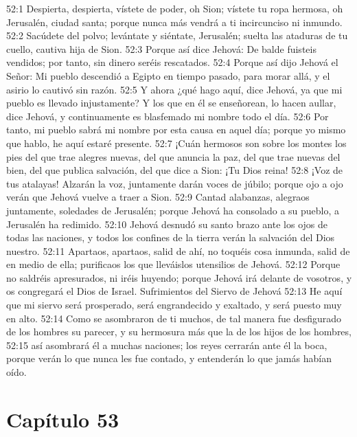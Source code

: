 52:1 Despierta, despierta, vístete de poder, oh Sion; vístete tu ropa hermosa, oh Jerusalén, ciudad santa; porque nunca más vendrá a ti incircunciso ni inmundo. 
52:2 Sacúdete del polvo; levántate y siéntate, Jerusalén; suelta las ataduras de tu cuello, cautiva hija de Sion. 
52:3 Porque así dice Jehová: De balde fuisteis vendidos; por tanto, sin dinero seréis rescatados. 
52:4 Porque así dijo Jehová el Señor: Mi pueblo descendió a Egipto en tiempo pasado, para morar allá, y el asirio lo cautivó sin razón. 
52:5 Y ahora ¿qué hago aquí, dice Jehová, ya que mi pueblo es llevado injustamente? Y los que en él se enseñorean, lo hacen aullar, dice Jehová, y continuamente es blasfemado mi nombre todo el día. 
52:6 Por tanto, mi pueblo sabrá mi nombre por esta causa en aquel día; porque yo mismo que hablo, he aquí estaré presente. 
52:7 ¡Cuán hermosos son sobre los montes los pies del que trae alegres nuevas, del que anuncia la paz, del que trae nuevas del bien, del que publica salvación, del que dice a Sion: ¡Tu Dios reina! 
52:8 ¡Voz de tus atalayas! Alzarán la voz, juntamente darán voces de júbilo; porque ojo a ojo verán que Jehová vuelve a traer a Sion. 
52:9 Cantad alabanzas, alegraos juntamente, soledades de Jerusalén; porque Jehová ha consolado a su pueblo, a Jerusalén ha redimido. 
52:10 Jehová desnudó su santo brazo ante los ojos de todas las naciones, y todos los confines de la tierra verán la salvación del Dios nuestro. 
52:11 Apartaos, apartaos, salid de ahí, no toquéis cosa inmunda, salid de en medio de ella; purificaos los que lleváislos utensilios de Jehová. 
52:12 Porque no saldréis apresurados, ni iréis huyendo; porque Jehová irá delante de vosotros, y os congregará el Dios de Israel. 
Sufrimientos del Siervo de Jehová 
52:13 He aquí que mi siervo será prosperado, será engrandecido y exaltado, y será puesto muy en alto. 
52:14 Como se asombraron de ti muchos, de tal manera fue desfigurado de los hombres su parecer, y su hermosura más que la de los hijos de los hombres, 
52:15 así asombrará él a muchas naciones; los reyes cerrarán ante él la boca, porque verán lo que nunca les fue contado, y entenderán lo que jamás habían oído. 
\section*{Capítulo 53 }
 
